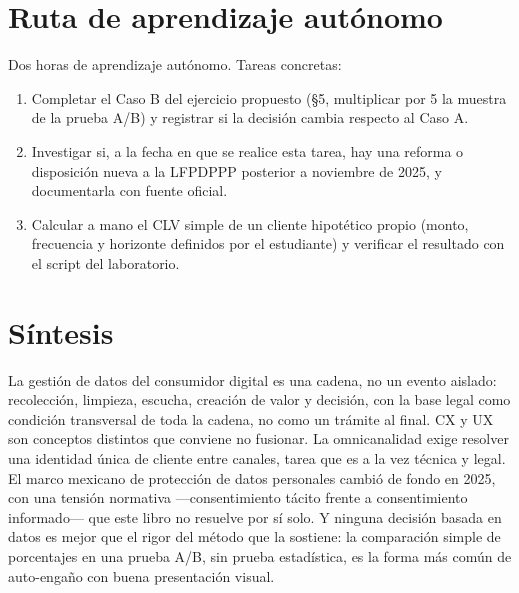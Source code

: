 \section{Ruta de aprendizaje autónomo}

Dos horas de aprendizaje autónomo. Tareas concretas:
\begin{enumerate}
  \item Completar el Caso B del ejercicio propuesto (§5, multiplicar por 5
  la muestra de la prueba A/B) y registrar si la decisión cambia respecto al
  Caso A.
  \item Investigar si, a la fecha en que se realice esta tarea, hay una
  reforma o disposición nueva a la LFPDPPP posterior a noviembre de 2025, y
  documentarla con fuente oficial.
  \item Calcular a mano el CLV simple de un cliente hipotético propio
  (monto, frecuencia y horizonte definidos por el estudiante) y verificar el
  resultado con el script del laboratorio.
\end{enumerate}

\section{Síntesis}

La gestión de datos del consumidor digital es una cadena, no un evento
aislado: recolección, limpieza, escucha, creación de valor y decisión, con
la base legal como condición transversal de toda la cadena, no como un
trámite al final. CX y UX son conceptos distintos que conviene no fusionar.
La omnicanalidad exige resolver una identidad única de cliente entre
canales, tarea que es a la vez técnica y legal. El marco mexicano de
protección de datos personales cambió de fondo en 2025, con una tensión
normativa —consentimiento tácito frente a consentimiento informado— que este
libro no resuelve por sí solo. Y ninguna decisión basada en datos es mejor
que el rigor del método que la sostiene: la comparación simple de
porcentajes en una prueba A/B, sin prueba estadística, es la forma más común
de auto-engaño con buena presentación visual.

